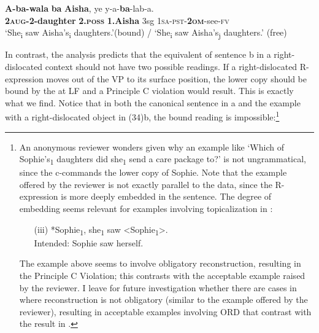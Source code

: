 \documentclass[output=paper
,newtxmath
,modfonts
,nonflat]{langsci/langscibook}
\begin{document}
\ex\label{ex:ranero:33b}
\gll \textbf{A-ba-wala} \textbf{ba}        \textbf{Aisha},   ye   y-a-\textbf{ba}{}-lab-a.\\
\textbf{2\textsc{aug}}\textbf{{}-2-daughter} \textbf{2.}\textbf{\textsc{poss}} \textbf{1.Aisha} 3sg \textsc{1sa-pst-}\textbf{\textsc{2om}}{}-see-\textsc{fv}\\
\glt ‘She\textsubscript{i} saw Aisha’s\textsubscript{i} daughters.’(bound) / ‘She\textsubscript{i} saw Aisha’s\textsubscript{j} daughters.’ (free)
\z
\z

\textup{In contrast, the analysis predicts that the equivalent of sentence b in a right-dislocated context should not have two possible readings. If a right-dislocated R-expression moves out of the VP to its surface position, the lower copy should be bound by the  at LF and a Principle C violation would result. This is exactly what we find. Notice that in both the canonical sentence in a and the example with a right-dislocated object in (34)b, the bound reading is impossible}:\footnote{An anonymous reviewer wonders given  why an  example like ‘Which of Sophie’s\textsubscript{1} daughters did she\textsubscript{1} send a care package to?’ is not ungrammatical, since the  c-commands the lower copy of Sophie. Note that the example offered by the reviewer is not exactly parallel to the  data, since the R-expression is more deeply embedded in the  sentence. The degree of embedding seems relevant for examples involving topicalization in :
\begin{enumerate}
\item[(iii)] *Sophie\textsubscript{1}, she\textsubscript{1} saw <Sophie\textsubscript{1}>.\\Intended: Sophie saw herself.
\end{enumerate}
The example above seems to involve obligatory reconstruction, resulting in the Principle C Violation; this contrasts with the acceptable example raised by the reviewer. I leave for future investigation whether there are cases in  where reconstruction is not obligatory (similar to the example offered by the reviewer), resulting in acceptable examples involving ORD that contrast with the result in .}
\end{document}
